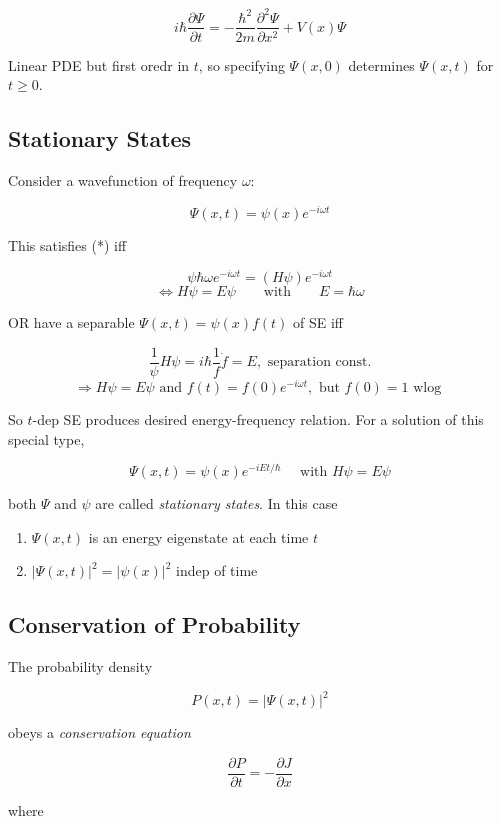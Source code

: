 \documentclass[a4paper]{article}
\begin{document}
\[ i \hbar \frac{\partial  \Psi}{\partial t} =  - \frac{\hbar^{2}}{2m} \frac{\partial^{2} \Psi  }{\partial x^{2}} + V(x) \Psi \]

Linear PDE but first oredr in $ t $, so specifying $ \Psi(x,0) $ determines $ \Psi(x,t) $ for $ t \geq 0 $. 

\subsection{Stationary States}

Consider a wavefunction of frequency $ \omega $:

\[ \Psi(x,t) = \psi(x) e^{-i \omega t} \]

This satisfies (*) iff

\[ \psi \hbar \omega e^{- i \omega t} = (H \psi) e^{- i \omega t} \]
\[ \iff H\psi = E \psi \qquad \text{with} \qquad E = \hbar \omega \]

OR have a separable $ \Psi(x,t) = \psi(x) f(t) $ of SE iff

\[ \frac{1}{\psi} H \psi = i \hbar \frac{1}{f} \dot{f} = E, \text{ separation const.} \]
\[ \Rightarrow H \psi = E \psi \text{ and } f(t) = f(0) e^{-i \omega t}, \text{ but } f(0) = 1 \text{ wlog } \]

So $ t $-dep SE produces desired energy-frequency relation. For a solution of this special type, 

\[ \Psi (x,t) = \psi(x) e^{-iEt/\hbar} \quad \text{ with } H \psi = E \psi \]

both $ \Psi $ and $ \psi $ are called \emph{stationary states}. In this case

\begin{enumerate}
	\item $ \Psi(x,t) $ is an energy eigenstate at each time $ t $
	\item $ | \Psi(x,t) |^{2} = | \psi(x) |^{2} $ indep of time
\end{enumerate}

\subsection{Conservation of Probability}
The probability density 

\[ P(x,t) = | \Psi(x,t) |^{2} \]

obeys a \emph{conservation equation }

\[ \frac{\partial P }{\partial t} = - \frac{\partial J }{\partial x} \]

where 
\end{document}
